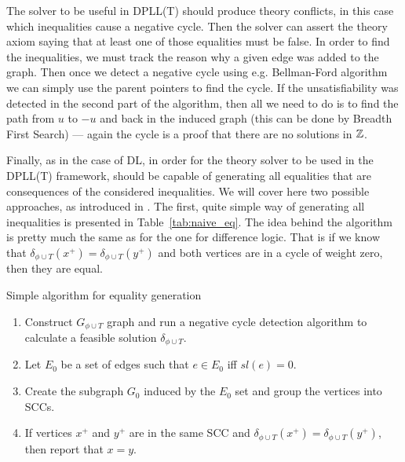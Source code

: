 The solver to be useful in DPLL(T) should produce theory conflicts, in this case
which inequalities cause a negative cycle. Then the solver can assert the theory
axiom saying that at least one of those equalities must be false. In order to
find the inequalities, we must track the reason why a given edge was added to
the graph. Then once we detect a negative cycle using e.g. Bellman-Ford
algorithm we can simply use the parent pointers to find the cycle. If the
unsatisfiability was detected in the second part of the algorithm, then all we
need to do is to find the path from $u$ to $-u$ and back in the induced graph
(this can be done by Breadth First Search) --- again the cycle is a proof that
there are no solutions in $\mathbb{Z}$.

Finally, as in the case of DL, in order for the theory solver to be used in the
DPLL(T) framework, should be capable of generating all equalities that are
consequences of the considered inequalities. We will cover here two possible
approaches, as introduced in \cite{bib:ms_utvpi}. The first, quite simple way of
generating all inequalities is presented in Table~\ref{tab:naive_eq}. The idea
behind the algorithm is pretty much the same as for the one for difference
logic. That is if we know that
$\delta_{\phi \cup T}(x^+) = \delta_{\phi \cup T}(y^+)$
and both vertices are in a cycle of weight zero, then they are equal.

\begin{table}
\caption{Simple algorithm for equality generation}
\label{tab:naive_eq}
\begin{enumerate}
\item Construct $G_{\phi \cup T}$ graph and run a negative cycle detection
  algorithm to calculate a feasible solution $\delta_{\phi \cup T}$.
\item Let $E_0$ be a set of edges such that $e \in E_0$ iff $sl(e) = 0$.
\item Create the subgraph $G_0$ induced by the $E_0$ set and group the vertices
  into SCCs.
\item If vertices $x^+$ and $y^+$ are in the same SCC and
  $\delta_{\phi \cup T}(x^+) = \delta_{\phi \cup T}(y^+)$, then report that
  $x = y$.
\end{enumerate}
\end{table}

